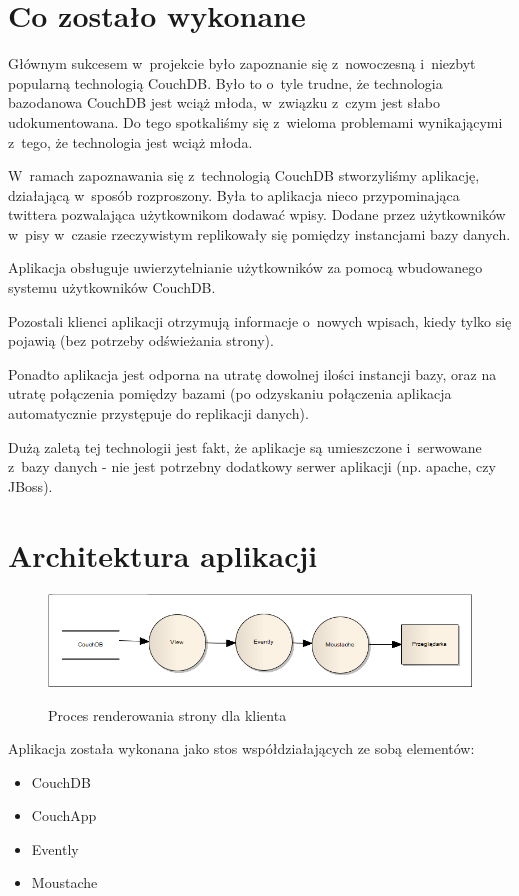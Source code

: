 \documentclass[a4paper]{article}
\begin{document}
\section{Co zostało wykonane}
Głównym sukcesem w~projekcie było zapoznanie się z~nowoczesną i~niezbyt popularną technologią CouchDB.
Było to o~tyle trudne, że technologia bazodanowa CouchDB jest wciąż młoda, w~związku z~czym jest słabo udokumentowana.
Do tego spotkaliśmy się z~wieloma problemami wynikającymi z~tego, że technologia jest wciąż młoda.

W~ramach zapoznawania się z~technologią CouchDB stworzyliśmy aplikację, działającą w~sposób rozproszony.
Była to aplikacja nieco przypominająca twittera pozwalająca użytkownikom dodawać wpisy.
Dodane przez użytkowników w~pisy w~czasie rzeczywistym replikowały się pomiędzy instancjami bazy danych.

Aplikacja obsługuje uwierzytelnianie użytkowników za pomocą wbudowanego systemu użytkowników CouchDB.

Pozostali klienci aplikacji otrzymują informacje o~nowych wpisach, kiedy tylko się pojawią (bez potrzeby odświeżania strony).

Ponadto aplikacja jest odporna na utratę dowolnej ilości instancji bazy, oraz na utratę połączenia pomiędzy bazami
(po odzyskaniu połączenia aplikacja automatycznie przystępuje do replikacji danych).

Dużą zaletą tej technologii jest fakt, że aplikacje są umieszczone i~serwowane z~bazy danych - nie jest potrzebny dodatkowy serwer aplikacji (np. apache, czy JBoss).


\newpage
\section{Architektura aplikacji}
\begin{figure}[bt]
  \caption{Proces renderowania strony dla klienta}
  \centering
  \includegraphics[width=\textwidth]{couch.png}
  \label{arch}
\end{figure}

Aplikacja została wykonana jako stos współdziałających ze sobą elementów:
\begin{itemize}
  \item CouchDB
  \item CouchApp
  \item Evently
  \item Moustache
\end{itemize}
\end{document}
